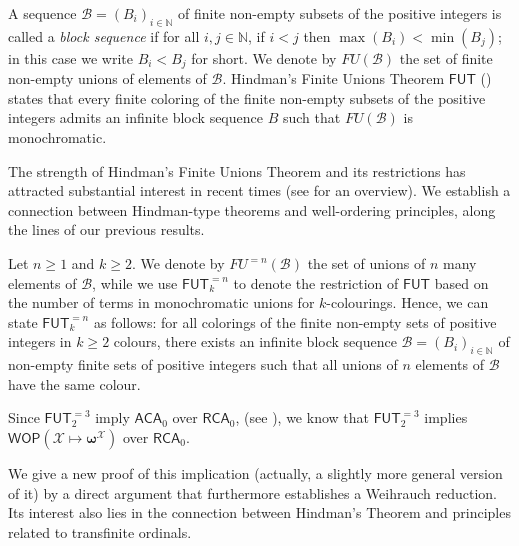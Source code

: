 \documentclass{amsart}
\newcommand\Nat{\mathbb{N}}
\newcommand\RCA{\mathsf{RCA}}
\newcommand\ACA{\mathsf{ACA}}
\newcommand\FUT{\mathsf{FUT}}
\newcommand\WOP{\mathsf{WOP}}
\newcommand{\LoX}{\mathcal{X}}
\newcommand\boldomega{\pmb{\omega}}
\begin{document}
A sequence $\mathcal{B} = (B_i)_{i\in \Nat}$ of finite non-empty subsets of the positive integers is called a {\em block sequence} if
for all $i, j\in \Nat$, if $i < j$ then $\max(B_i) < \min(B_j)$; in this case we write $B_i < B_j$ for short.
We denote by $FU(\mathcal{B})$ the set of finite non-empty unions of elements of $\mathcal{B}$. Hindman's Finite Unions Theorem $\FUT$
(\cite{Hin:74}) states that every finite coloring of the finite non-empty subsets of the positive integers admits an infinite block 
sequence $B$ such that $FU(\mathcal{B})$ is monochromatic. 

The strength of Hindman's Finite Unions Theorem and its restrictions has attracted substantial interest
in recent times (see \cite{Car:overview} for an overview). We establish a connection between Hindman-type
theorems and well-ordering principles, along the lines of our previous results. 

Let $n \geq 1$ and $k \geq 2$. We denote by $FU^{=n}(\mathcal{B})$ the set of unions of $n$ many elements of $\mathcal{B}$, while we use $\FUT^{=n}_k$ to denote the restriction of $\FUT$ based on the number of terms in monochromatic unions for $k$-colourings. Hence, we can state $\FUT^{=n}_k$ as follows: for all colorings of the finite non-empty sets of positive integers
in $k \geq 2$ colours, there exists an infinite block sequence $\mathcal{B} = (B_i)_{i \in \Nat}$ of non-empty finite sets
of positive integers such that all unions of $n$ elements of $\mathcal{B}$ have the 
same colour. 


Since $\FUT^{=3}_2$ imply $\ACA_0$ over $\RCA_0$, (see \cite{CKLZ:20}), we know that 
$\FUT^{=3}_2$ implies $\WOP(\LoX\mapsto \boldomega^\LoX)$ over $\RCA_0$. 

We give a new proof  of this implication (actually, a slightly more general version of it) by a direct argument that furthermore 
establishes a Weihrauch reduction. Its interest also lies in the connection between 
Hindman's Theorem and principles related to transfinite ordinals. 
\end{document}
